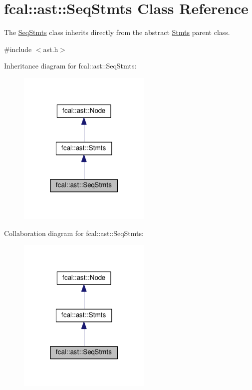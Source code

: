 \hypertarget{classfcal_1_1ast_1_1SeqStmts}{}\section{fcal\+:\+:ast\+:\+:Seq\+Stmts Class Reference}
\label{classfcal_1_1ast_1_1SeqStmts}


The \hyperlink{classfcal_1_1ast_1_1SeqStmts}{Seq\+Stmts} class inherits directly from the abstract \hyperlink{classfcal_1_1ast_1_1Stmts}{Stmts} parent class.  




{\ttfamily \#include $<$ast.\+h$>$}



Inheritance diagram for fcal\+:\+:ast\+:\+:Seq\+Stmts\+:
\nopagebreak
\begin{figure}[H]
\begin{center}
\leavevmode
\includegraphics[width=181pt]{classfcal_1_1ast_1_1SeqStmts__inherit__graph}
\end{center}
\end{figure}


Collaboration diagram for fcal\+:\+:ast\+:\+:Seq\+Stmts\+:
\nopagebreak
\begin{figure}[H]
\begin{center}
\leavevmode
\includegraphics[width=181pt]{classfcal_1_1ast_1_1SeqStmts__coll__graph}
\end{center}
\end{figure}

